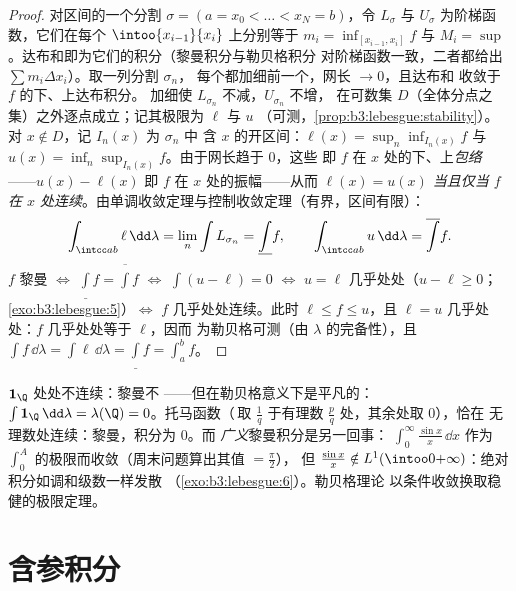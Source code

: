 \begin{proof}
对区间的一个分割 $\sigma = (a = x_0 < \dots < x_N = b)$，令
$L_\sigma$ 与 $U_\sigma$ 为阶梯函数，它们在每个
$\intoo{x_{i-1}}{x_i}$ 上分别等于 $m_i = \inf_{[x_{i-1}, x_i]}f$ 与
$M_i = \sup$。达布和即为它们的积分（黎曼积分与勒贝格积分
对阶梯函数一致，二者都给出 $\sum
m_i\Delta x_i$）。取一列分割 $\sigma_n$，
每个都加细前一个，网长 $\to 0$，且达布和
收敛于 $f$ 的下、上达布积分。
加细使 $L_{\sigma_n}$ 不减，$U_{\sigma_n}$ 不增，
在可数集
$D$（全体分点之集）之外逐点成立；记其极限为 $\ell$ 与 $u$
（可测，\cref{prop:b3:lebesgue:stability}）。对 $x \notin
D$，记 $I_n(x)$ 为 $\sigma_n$ 中
含 $x$ 的开区间：$\ell(x) = \sup_n\inf_{I_n(x)}f$ 与 $u(x) =
\inf_n\sup_{I_n(x)}f$。由于网长趋于 $0$，这些
即 $f$ 在 $x$ 处的下、上\emph{包络}
——$u(x) - \ell(x)$ 即 $f$ 在 $x$ 处的振幅——从而
\emph{$\ell(x) = u(x)$ 当且仅当 $f$ 在 $x$ 处连续}。由单调收敛定理与控制收敛定理（有界，区间有限）：
\[
\int_{\intcc ab}\ell\,\dd\lambda = \lim_n\int L_{\sigma_n}
= \underline{\int}f,
\qquad
\int_{\intcc ab}u\,\dd\lambda = \overline{\int}f .
\]
$f$ 黎曼 $\iff$ $\underline\int f =
\overline\int f$ $\iff$ $\int(u - \ell) = 0$ $\iff$ $u = \ell$
几乎处处（$u - \ell \geq 0$；\cref{exo:b3:lebesgue:5}）$\iff$ $f$
几乎处处连续。此时 $\ell \leq f \leq u$，且 $\ell =
u$ 几乎处处：$f$ 几乎处处等于 $\ell$，因而
为勒贝格可测（由 $\lambda$ 的完备性），且
$\int f\,\dd\lambda = \int\ell\,\dd\lambda = \underline\int f =
\int_a^bf$。
\end{proof}

\begin{example}\label{ex:b3:lebesgue:riemannexamples}
$\mathbf 1_\Q$ 处处不连续：黎曼不
——但在勒贝格意义下是平凡的：$\int\mathbf 1_\Q\,\dd\lambda =
\lambda(\Q) = 0$。托马函数（\,取 $\frac1q$ 于有理数
$\frac pq$ 处，其余处取 $0$），恰在
无理数处连续：黎曼，积分为 $0$。而
\emph{广义}黎曼积分是另一回事：
$\int_0^\infty\frac{\sin x}x\,\dd x$ 作为
$\int_0^A$ 的极限而收敛（周末问题算出其值 $= \frac\pi2$），
但 $\frac{\sin x}x \notin L^1(\intoo0{+\infty})$：绝对
积分如调和级数一样发散
（\cref{exo:b3:lebesgue:6}）。勒贝格理论
以条件收敛换取稳健的极限定理。
\end{example}

\section{含参积分}

